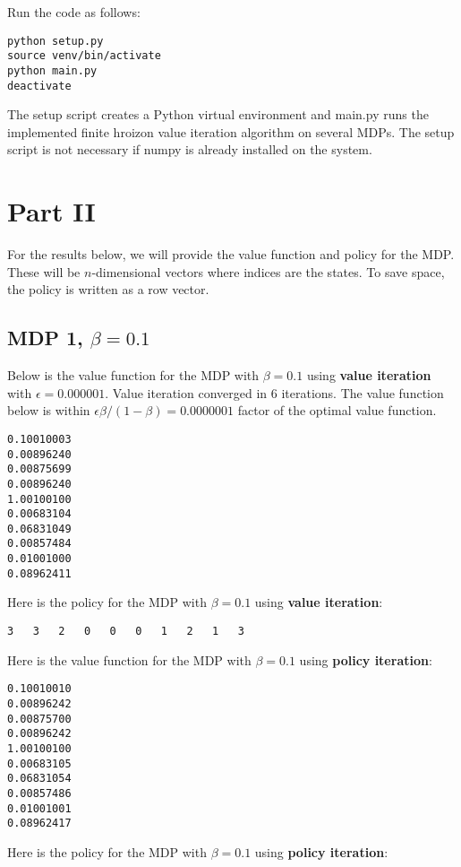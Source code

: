 \documentclass[paper=a4, fontsize=11pt]{scrartcl}
\begin{document}
Run the code as follows:

\begin{verbatim}
python setup.py
source venv/bin/activate
python main.py
deactivate
\end{verbatim}

The setup script creates a Python virtual environment and main.py runs the implemented finite hroizon value iteration algorithm on several MDPs. The setup script is not necessary if numpy is already installed on the system.

\section{Part II}

For the results below, we will provide the value function and policy for the MDP. These will be $n$-dimensional vectors where indices are the states. To save space, the policy is written as a row vector.

\subsection{MDP 1, $\beta = 0.1$}

Below is the value function for the MDP with $\beta = 0.1$ using \textbf{value iteration} with $\epsilon = 0.000001$. Value iteration converged in 6 iterations. The value function below is within $\epsilon \beta / (1 - \beta) = 0.0000001$ factor of the optimal value function.

\begin{verbatim}
0.10010003
0.00896240
0.00875699
0.00896240
1.00100100
0.00683104
0.06831049
0.00857484
0.01001000
0.08962411
\end{verbatim}

Here is the policy for the MDP with $\beta = 0.1$ using \textbf{value iteration}:

\begin{verbatim}
3	3	2	0	0	0	1	2	1	3
\end{verbatim}

Here is the value function for the MDP with $\beta = 0.1$ using \textbf{policy iteration}:

\begin{verbatim}
0.10010010
0.00896242
0.00875700
0.00896242
1.00100100
0.00683105
0.06831054
0.00857486
0.01001001
0.08962417
\end{verbatim}

Here is the policy for the MDP with $\beta = 0.1$ using \textbf{policy iteration}:
\end{document}
